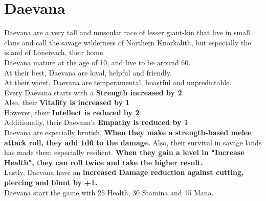 \section{Daevana}\label{race:daevana}
Daevana are a very tall and muscular race of lesser giant-kin that live in small clans and call the savage wilderness of Northern Knorkalith, but especially the island of Lonereach, their home.\\
Daevana mature at the age of 10, and live to be around 60.\\
At their best, Daevana are loyal, helpful and friendly.\\
At their worst, Daevana are temperamental, boastful and unpredictable.\\
Every Daevana starts with a \textbf{Strength increased by 2}.\\
Also, their \textbf{Vitality is increased by 1}\\
However, their \textbf{Intellect is reduced by 2}\\
Additionally, their Daevana's \textbf{Empathy is reduced by 1}\\
Daevana are especially brutish. \textbf{When they make a strength-based melee attack roll, they add 1d6 to the damage.}
Also, their survival in savage lands has made them especially resilient.
\textbf{When they gain a level in "Increase Health", they can roll twice and take the higher result.}\\
Lastly, Daevana have an \textbf{increased Damage reduction against cutting, piercing and blunt by +1.}\\
Daevana start the game with 25 Health, 30 Stamina and 15 Mana.